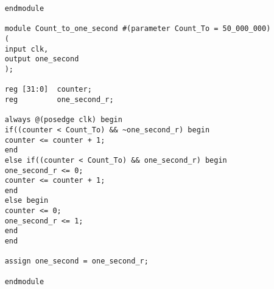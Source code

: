 \begin{lstlisting}
	endmodule 
	
	module Count_to_one_second #(parameter Count_To = 50_000_000)
	(
	input clk,
	output one_second
	);
	
	reg [31:0]  counter;
	reg         one_second_r;
	
	always @(posedge clk) begin
	if((counter < Count_To) && ~one_second_r) begin
	counter <= counter + 1;
	end
	else if((counter < Count_To) && one_second_r) begin
	one_second_r <= 0;
	counter <= counter + 1;
	end
	else begin
	counter <= 0;
	one_second_r <= 1;
	end
	end
	
	assign one_second = one_second_r;
	
	endmodule
	\end{lstlisting}
	
\ifx\allfiles\undefined

\else
\fi

